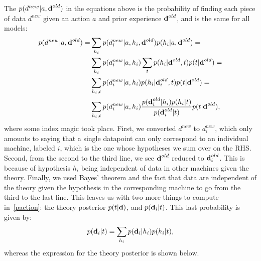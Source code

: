 \documentclass[11pt, a4paper]{article}
\begin{document}
The $p(d^{new}| a, {\textbf d^{old}})$ in the equations above is the probability of finding each piece of data $d^{new}$ given an action $a$ and prior experience ${\textbf d^{old}}$, and is the same for all models:
\begin{equation}
\begin{split}
p(d^{new}| a, {\textbf d^{old}})=&\sum_{h_i} p(d_i^{new}|a, h_i, {\textbf d^{old}}) p(h_i|a, {\textbf d^{old}})=\\
&\sum_{h_i} p(d_i^{new}|a, h_i) \sum_t p(h_i| {\textbf d^{old}}, t) p(t|{\textbf d^{old}})=\\
&\sum_{h_i,t} p(d_i^{new}|a, h_i) p(h_i| {\textbf d^{old}_i}, t) p(t|{\textbf d^{old}})=\\
&\sum_{h_i,t} p(d_i^{new}|a, h_i) \frac{p({\textbf d_i^{old}} | h_i) p(h_i | t)}{p({\textbf d_i^{old}} | t)} p(t|{\textbf d^{old}}),
\end{split}
\label{paction}
\end{equation}
where some index magic took place. First, we converted $d^{new}$ to $d_i^{new}$, which only amounts to saying that a single datapoint can only correspond to an individual machine, labeled $i$, which is the one whose hypotheses we sum over on the RHS. Second, from the second to the third line, we see ${\textbf d^{old}}$ reduced to ${\textbf d_i^{old}}$. This is because of hypothesis $h_i$ being independent of data in other machines given the theory. Finally, we used Bayes' theorem and the fact that data are independent of the theory given the hypothesis in the corresponding machine to go from the third to the last line. 
This leaves us with two more things to compute in~\eqref{paction}: the theory posterior $p(t|{\textbf d})$, and $p({\textbf d_i} | t)$. This last probability is given by:
\begin{equation}
p({\textbf d_i} | t) = \sum_{h_i} p({\textbf d_i} | h_i) p(h_i | t),
\end{equation}
whereas the expression for the theory posterior is shown below.
\end{document}
